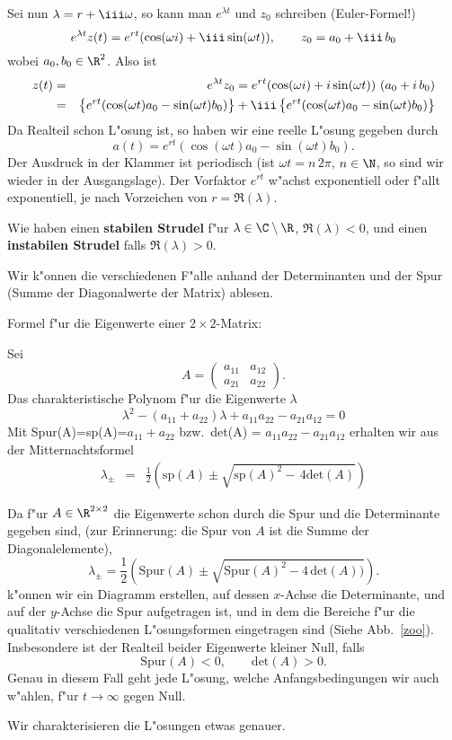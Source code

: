 Sei nun $\lambda=r+{\iii} \omega$, so kann man $e^{\lambda t}$ und $z_0$ schreiben 
(Euler-Formel!)
$$ e^{\lambda t}z(t) = e^{r t}(\cos(\omega i)+\iii\sin(\omega t)),\qquad
z_0 = a_0+\iii \, b_0$$
wobei $a_0,b_0\in\R^2$. Also ist
\begin{eqnarray*}
 z(t) &=& e^{\lambda t} z_0 = 
e^{r t}(\cos(\omega i)+i\sin(\omega t))\,\,(a_0+i\, b_0)\\
&=& 
\left\{e^{r t}(\cos(\omega t) a_0-\sin(\omega t)b_0)\right\}
+\iii 
\left\{e^{r t}(\cos(\omega t) a_0-\sin(\omega t)b_0)\right\}
\end{eqnarray*}
Da Realteil schon L"osung ist, so haben wir eine reelle L"osung gegeben durch
$$ a(t) = e^{r t}(\cos(\omega t) a_0-\sin(\omega t)b_0).$$
Der Ausdruck in der Klammer ist periodisch (ist $\omega t=n\, 2\pi$, $n\in\N$, 
so sind wir wieder in der Ausgangslage). Der Vorfaktor $e^{rt}$ w"achst exponentiell oder f"allt exponentiell, je nach Vorzeichen von $r=\Re(\lambda)$.\par
Wie haben einen {\bf stabilen Strudel} f"ur $\lambda\in\C\setminus\R$, $\Re(\lambda)<0$, und einen {\bf instabilen Strudel} falls $\Re(\lambda)>0$. 
\par\medskip

Wir k"onnen die verschiedenen F"alle anhand der Determinanten und 
der Spur (Summe der Diagonalwerte der Matrix) ablesen.\par\medskip

\begin{sbem}
{Formel f"ur die Eigenwerte einer $2\times 2$-Matrix:}\par
Sei
$$ A 
= \left(\begin{array}{cc} a_{11} & a_{12}\\ a_{21}&a_{22}  \end{array}\right).
$$
Das charakteristische Polynom f"ur die Eigenwerte $\lambda$  
$$ \lambda^2 -(a_{11}+a_{22})\lambda + a_{11}a_{22}-a_{21}a_{12}=0
$$
Mit Spur(A)=sp(A)=$a_{11}+a_{22}$ bzw.\ det(A) = $a_{11}a_{22}-a_{21}a_{12}$ 
erhalten wir aus der Mitternachtsformel
\begin{eqnarray*}
\lambda_\pm & = & \frac 1 2\left(\mbox{sp}(A)\pm\sqrt{\mbox{sp}(A)^2-\,4\mbox{det}(A)}\right)
\end{eqnarray*}
\end{sbem}
Da f"ur $A\in\R^{2\times 2}$ die Eigenwerte schon durch die Spur und die
 Determinante gegeben sind,  (zur Erinnerung: die Spur von $A$ ist die Summe 
der Diagonalelemente), 
$$ \lambda_\pm 
=\frac1 2\left( \mbox{Spur}(A) 
                 \pm\sqrt{\mbox{Spur}(A)^2-4\,\mbox{det}(A)) }\right).
$$
k"onnen wir ein Diagramm erstellen, auf dessen $x$-Achse die Determinante, und
 auf der $y$-Achse die Spur aufgetragen ist, und 
in dem die Bereiche f"ur die qualitativ verschiedenen L"osungsformen 
eingetragen sind (Siehe Abb.~\ref{zoo}). \\
Insbesondere ist der Realteil beider Eigenwerte kleiner Null, falls
$$ \mbox{Spur}(A)<0,\qquad\mbox{det}(A)>0.$$
Genau in diesem Fall geht jede L"osung, welche Anfangsbedingungen wir auch w"ahlen, f"ur $t\rightarrow\infty$ gegen Null.\par\medskip
Wir charakterisieren die L"osungen etwas genauer.

